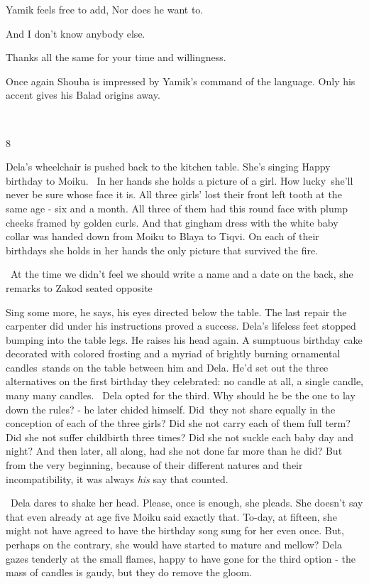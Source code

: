 \documentclass[letterpaper]{article}
\begin{document}
Yamik feels free to add, {\textquotedbl}Nor does he want to.{\textquotedbl}

{\textquotedbl}And I don't know anybody else.{\textquotedbl} 

{\textquotedbl}Thanks all the same for your time and willingness.{\textquotedbl}

Once again Shouba is impressed by Yamik's command of the language. Only his accent gives his Balad origins away.

~

8 

Dela's wheelchair is pushed back to the kitchen table. She's singing {\textquotedbl}Happy birthday to
Moiku{\textquotedbl}. ~In her hands she holds a picture of a girl. How lucky~she'll never be sure whose face it is. All
three girls' lost their front left tooth at the same age - six and a month. All three of them had this round face with
plump cheeks framed by golden curls. And that gingham dress with the white baby collar was handed down from Moiku to
Blaya to Tiqvi. On each of their birthdays she holds in her hands the only picture that survived the fire. 

\ {\textquotedbl}At the time we didn't feel we should write a name and a date on the back,{\textquotedbl} she remarks to
Zakod seated opposite

{\textquotedbl}Sing some more,{\textquotedbl} he says, his eyes directed below the table. The last repair the carpenter
did under his instructions proved a success. Dela's lifeless feet stopped bumping into the table legs. He raises his
head again. A sumptuous birthday cake decorated with colored frosting and a myriad of brightly burning ornamental
candles~stands on the table between him and Dela. He'd set out the three alternatives on the first birthday they
celebrated: no candle at all, a single candle, many many candles.~ Dela opted for the third. Why should he be the one
to lay down the rules? - he later chided himself. Did~they not share equally in the conception of each of the three
girls? Did she not carry each of them full term? Did she not suffer childbirth three times? Did she not suckle each
baby day and night? And then later, all along, had she not done far more than he did? But from the very beginning,
because of their different natures and their incompatibility, it was always \textit{his} say that counted.

~Dela dares to shake her head. {\textquotedbl}Please, once is enough,{\textquotedbl} she pleads. She doesn't say that
even already at age five Moiku said exactly that. To-day, at fifteen, she might not have agreed to have the birthday
song sung for her even once. But, perhaps on the contrary, she would have started to mature and mellow? Dela gazes
tenderly at the small flames, happy to have gone for the third option - the mass of candles is gaudy, but they do
remove the gloom.
\end{document}
